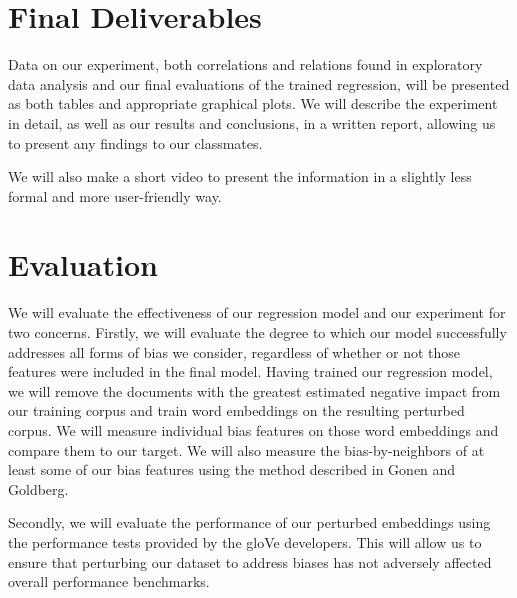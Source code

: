 \documentclass{article}
\begin{document}
\section{Final Deliverables}

Data on our experiment, both correlations and relations found in
exploratory data analysis and our final evaluations of the trained
regression, will be presented as both tables and appropriate graphical
plots. We will describe the experiment in detail, as well as our results
and conclusions, in a written report, allowing us to present any
findings to our classmates.

We will also make a short video to present the information in a
slightly less formal and more user-friendly way.

\section{Evaluation}

We will evaluate the effectiveness of our regression model and our
experiment for two concerns. Firstly, we will evaluate the degree to
which our model successfully addresses all forms of bias we consider,
regardless of whether or not those features were included in the final
model. Having trained our regression model, we will remove the documents
with the greatest estimated negative impact from our training
corpus and train word embeddings on the resulting perturbed corpus. We
will measure individual bias features on those word embeddings and
compare them to our target. We will also measure the bias-by-neighbors
of at least some of our bias features using the method described in
Gonen and Goldberg\cite{gonen_lipstick_2019}.

Secondly, we will evaluate the performance of our perturbed embeddings
using the performance tests provided by the gloVe developers. This will
allow us to ensure that perturbing our dataset to address biases has not
adversely affected overall performance benchmarks.

\printbibliography
\end{document}
